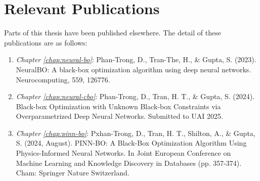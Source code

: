 \chapter*{Relevant Publications}
{}
Parts of this thesis have been published elsewhere. The detail of these publications are as follows:

\begin{enumerate}
    \item \textit{Chapter \ref{chap:neural-bo}}: Phan-Trong, D., Tran-The, H., \& Gupta, S. (2023). NeuralBO: A black-box optimization algorithm using deep neural networks. Neurocomputing, 559, 126776.
    \item \textit{Chapter \ref{chap:neural-cbo}}: Phan-Trong, D., Tran, H. T., \& Gupta, S. (2024). Black-box Optimization with Unknown Black-box Constraints via Overparametrized Deep Neural Networks. Submitted to UAI 2025.  
    \item \textit{Chapter \ref{chap:pinn-bo}}: Pxhan-Trong, D., Tran, H. T., Shilton, A., \& Gupta, S. (2024, August). PINN-BO: A Black-Box Optimization Algorithm Using Physics-Informed Neural Networks. In Joint European Conference on Machine Learning and Knowledge Discovery in Databases (pp. 357-374). Cham: Springer Nature Switzerland.
    
\end{enumerate}
